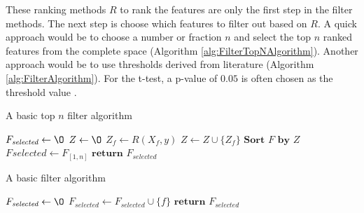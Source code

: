\documentclass[10pt,a4paper]{report}
\begin{document}
	These ranking methods $R$ to rank the features are only the first step in the filter methods. The next step is choose which features to filter out based on $R$. A quick approach would be to choose a number or fraction $n$ and select the top $n$ ranked features from the complete space (Algorithm \ref{alg:FilterTopNAlgorithm}). Another approach would be to use thresholds derived from literature \cite{donoho2008higher} (Algorithm \ref{alg:FilterAlgorithm}). For the t-test, a p-value of $0.05$ is often chosen as the threshold value \cite{storey2003statistical, higgins2003measuring}.
	
	\begin{algorithm}[H]
		\caption{A basic top $n$ filter algorithm \cite{Duch2006}}\label{alg:FilterTopNAlgorithm}
		\begin{algorithmic}[1]
			\State $F_{\textit{selected}} \gets \O$ 	
			\State $Z \gets \O$							
			 					
			\State $Z_f \gets R(X_f, y)$ 				 			
			\State $Z \gets Z \cup \{Z_f\}$ 				
			\EndFor
			\State $\textbf{Sort } F \textbf{ by } Z$ 
			\State $F_{}selected \gets F_{[1,n]}$ 
			\State $\textbf{return } F_{\textit{selected}}$
			\EndProcedure
		\end{algorithmic}
	\end{algorithm}	
	
	\begin{algorithm}[H]
		\caption{A basic filter algorithm \cite{Duch2006}}\label{alg:FilterAlgorithm}
		\begin{algorithmic}[1]
			\State $F_{\textit{selected}} \gets \O$ 	
			 					
						
			\State $F_{\textit{selected}} \gets F_{\textit{selected}} \cup \{f\}$ 
			\EndIf
			\EndFor
			\State $\textbf{return } F_{\textit{selected}}$
			\EndProcedure
		\end{algorithmic}
	\end{algorithm}
	
\end{document}
